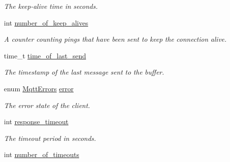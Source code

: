 \begin{DoxyCompactItemize}
\begin{DoxyCompactList}\small\item\em The keep-\/alive time in seconds. \end{DoxyCompactList}\item 
int \hyperlink{structmqtt__client_ac23a02868e9b8c5cd2619b73ee4fcea6}{number\+\_\+of\+\_\+keep\+\_\+alives}
\begin{DoxyCompactList}\small\item\em A counter counting pings that have been sent to keep the connection alive. \end{DoxyCompactList}\item 
time\+\_\+t \hyperlink{structmqtt__client_a48619e2ebe592a9757a3bda1ac97608d}{time\+\_\+of\+\_\+last\+\_\+send}
\begin{DoxyCompactList}\small\item\em The timestamp of the last message sent to the buffer. \end{DoxyCompactList}\item 
enum \hyperlink{group__api_gabfef25ed21446904fd8b3a71cfa1f203}{Mqtt\+Errors} \hyperlink{structmqtt__client_a3fa5996b4cca1aaf5be50c2597310478}{error}
\begin{DoxyCompactList}\small\item\em The error state of the client. \end{DoxyCompactList}\item 
int \hyperlink{structmqtt__client_a4ee652148f2b1b338f1527a85879e970}{response\+\_\+timeout}
\begin{DoxyCompactList}\small\item\em The timeout period in seconds. \end{DoxyCompactList}\item 
int \hyperlink{structmqtt__client_af5fed75fb3f83137d5c7635693cd7b6c}{number\+\_\+of\+\_\+timeouts}\hypertarget{structmqtt__client_af5fed75fb3f83137d5c7635693cd7b6c}{}\label{structmqtt__client_af5fed75fb3f83137d5c7635693cd7b6c}


\end{DoxyCompactItemize}
